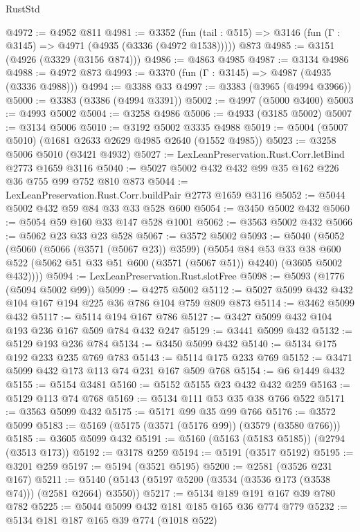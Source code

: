 \begin{lexlean}{RustStd}
\begin{coremodule}
@4972 := @4952 @811
@4981 := @3352
    (fun (tail : @515) => @3146 (fun (Γ : @3145) => @4971 (@4935 (@3336 (@4972 @1538)))))
    @873
@4985 := @3151 (@4926 (@3329 (@3156 @874)))
@4986 := @4863 @4985
@4987 := @3134 @4986
@4988 := @4972 @873
@4993 := @3370 (fun (Γ : @3145) => @4987 (@4935 (@3336 @4988)))
@4994 := @3388 @33
@4997 := @3383 (@3965 (@4994 @3966))
@5000 := @3383 (@3386 (@4994 @3391))
@5002 := @4997 (@5000 @3400)
@5003 := @4993 @5002
@5004 := @3258 @4986
@5006 := @4933 (@3185 @5002)
@5007 := @3134 @5006
@5010 := @3192 @5002 @3335 @4988
@5019 := @5004 (@5007 @5010) (@1681 @2633 @2629 @4985 @2640 (@1552 @4985))
@5023 := @3258 @5006 @5010 (@3421 @4932)
@5027 := LexLeanPreservation.Rust.Corr.letBind @2773 @1659 @3116
@5040 := @5027 @5002 @432 @432 @99 @35 @162 @226 @36 @755 @99 @752 @810 @873
@5044 := LexLeanPreservation.Rust.Corr.buildPair @2773 @1659 @3116
@5052 := @5044 @5002 @432 @59 @84 @33 @33 @528 @600
@5054 := @3450 @5002 @432
@5060 := @5054 @59 @160 @33 @147 @528 @1001
@5062 := @3563 @5002 @432
@5066 := @5062 @23 @33 @23 @528
@5067 := @3572 @5002
@5093 := @5040
    (@5052
      (@5060
        (@5066 (@3571 (@5067 @23)) @3599)
        (@5054
          @84
          @53
          @33
          @38
          @600
          @522
          (@5062 @51 @33 @51 @600 (@3571 (@5067 @51)) @4240)
          (@3605 @5002 @432))))
@5094 := LexLeanPreservation.Rust.slotFree
@5098 := @5093 (@1776 (@5094 @5002 @99))
@5099 := @4275 @5002
@5112 := @5027 @5099 @432 @432 @104 @167 @194 @225 @36 @786 @104 @759 @809 @873
@5114 := @3462 @5099 @432
@5117 := @5114 @194 @167 @786
@5127 := @3427 @5099 @432 @104 @193 @236 @167 @509 @784 @432 @247
@5129 := @3441 @5099 @432
@5132 := @5129 @193 @236 @784
@5134 := @3450 @5099 @432
@5140 := @5134 @175 @192 @233 @235 @769 @783
@5143 := @5114 @175 @233 @769
@5152 := @3471 @5099 @432 @173 @113 @74 @231 @167 @509 @768
@5154 := @6 @1449 @432
@5155 := @5154 @3481
@5160 := @5152 @5155 @23 @432 @432 @259
@5163 := @5129 @113 @74 @768
@5169 := @5134 @111 @53 @35 @38 @766 @522
@5171 := @3563 @5099 @432
@5175 := @5171 @99 @35 @99 @766
@5176 := @3572 @5099
@5183 := @5169 (@5175 (@3571 (@5176 @99)) (@3579 (@3580 @766)))
@5185 := @3605 @5099 @432
@5191 := @5160 (@5163 (@5183 @5185)) (@2794 (@3513 @173))
@5192 := @3178 @259
@5194 := @5191 (@3517 @5192)
@5195 := @3201 @259
@5197 := @5194 (@3521 @5195)
@5200 := @2581 (@3526 @231 @167)
@5211 := @5140 (@5143 (@5197 @5200 (@3534 (@3536 @173 (@3538 @74))) (@2581 @2664) @3550))
@5217 := @5134 @189 @191 @167 @39 @780 @782
@5225 := @5044 @5099 @432 @181 @185 @165 @36 @774 @779
@5232 := @5134 @181 @187 @165 @39 @774 (@1018 @522)

\end{coremodule}
\end{lexlean}
